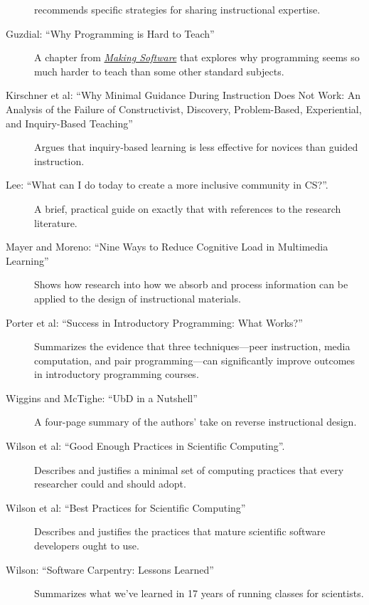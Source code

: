 \begin{description}
recommends specific strategies for sharing instructional expertise.
\item[Guzdial:
``Why Programming is Hard to Teach'']
A chapter from
\emph{\href{http://www.amazon.com/Making-Software-Really-Works-Believe/dp/0596808321/}{Making
Software}} that explores why programming seems so much harder to teach
than some other standard subjects.
\item[Kirschner et al:
``Why Minimal Guidance During Instruction Does Not Work:
An Analysis of the Failure of Constructivist, Discovery, Problem-Based, Experiential, and Inquiry-Based Teaching'']
Argues that inquiry-based learning is less effective for novices than
guided instruction.
\item[Lee:
``What can I do today to create a more inclusive community in CS?''.]
A brief, practical guide on exactly that with references to the research
literature.
\item[Mayer and Moreno:
``Nine Ways to Reduce Cognitive Load in Multimedia Learning'']
Shows how research into how we absorb and process information can be
applied to the design of instructional materials.
\item[Porter et al:
``Success in Introductory Programming: What Works?'']
Summarizes the evidence that three techniques---peer instruction, media
computation, and pair programming---can significantly improve outcomes
in introductory programming courses.
\item[Wiggins and McTighe:
``UbD in a Nutshell'']
A four-page summary of the authors' take on reverse instructional
design.
\item[Wilson et al: ``Good Enough Practices in Scientific Computing''.]
Describes and justifies a minimal set of computing practices that every
researcher could and should adopt.
\item[Wilson et al:
``Best Practices for Scientific Computing'']
Describes and justifies the practices that mature scientific software
developers ought to use.
\item[Wilson:
``Software Carpentry: Lessons Learned'']
Summarizes what we've learned in 17 years of running classes for
scientists.
\end{description}
